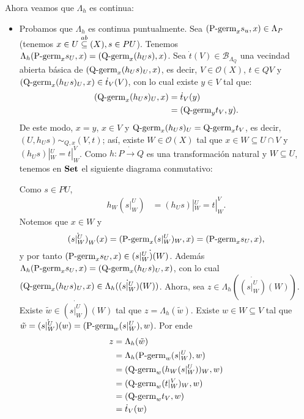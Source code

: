 Ahora veamos que $\Lambda_h$ es continua:
\begin{itemize}
   \item Probamos que $\Lambda_h$ es continua puntualmente. Sea $(\normalfont{\text{P-germ}}_{x}s_{u},x)\in \Lambda_P$ (tenemos $x\in U\stackrel{ab}{\subseteq}(X), s\in PU$). Tenemos $\Lambda_h(\normalfont{\text{P-germ}}_{x}s_{U},x)=(\normalfont{\text{Q-germ}}_{x}(h_{U}s),x)$. Sea $\dot{t}(V)\in\mathcal{B}_{\Lambda_Q}$ una vecindad abierta básica de $(\normalfont{\text{Q-germ}}_{x}(h_{U}s)_{U},x)$, es decir, $V\in\mathcal{O}(X)$, $t\in QV$ y $(\normalfont{\text{Q-germ}}_{x}(h_{U}s)_{U},x)\in\dot{t}_{V}(V)$, con lo cual existe $y\in V$ tal que:
      $$
      \begin{aligned}
         (\normalfont{\text{Q-germ}}_{x}(h_{U}s)_{U},x)&=\dot{t}_{V}(y)\\
                                   &=(\normalfont{\text{Q-germ}}_{y}t_{V},y).
      \end{aligned}
      $$
      De este modo, $x=y$, $x\in V$ y $\normalfont{\text{Q-germ}}_{x}(h_{U}s)_{U}=\normalfont{\text{Q-germ}}_{x}t_{V}$, es decir, $(U,h_{U}s)\sim_{Q,x}(V,t)$; así, existe $W\in\mathcal{O}(X)$ tal que $x\in W\subseteq U\cap V$ y $(h_{U}s)|^{U}_{W}=t|^{V}_{W}$. Como $h:P\dot{\to} Q$ es una transformación natural y $W\subseteq U$, tenemos en $\normalfont{\textbf{Set}}$ el siguiente diagrama conmutativo:
      
      Como $s\in PU$,
      $$
      \begin{aligned}
         h_{W}(s|^{U}_{W})&=(h_{U}s)|^{U}_{W}=t|^{V}_{W}.
      \end{aligned}
      $$
      Notemos que $x\in W$ y 
      $$
         \dot{(s|^{U}_{W})}_{W}(x)=(\normalfont{\text{P-germ}}_{x}(s|^{U}_{W})_W,x)=(\normalfont{\text{P-germ}}_{x}s_{U},x),
      $$
      y por tanto $(\normalfont{\text{P-germ}}_{x}s_{U},x)\in\dot{(s|^{U}_{W})(W)}$. Además $\Lambda_h(\normalfont{\text{P-germ}}_{x}s_{U},x)=(\normalfont{\text{Q-germ}}_{x}(h_{U}s)_{U},x)$, con lo cual $(\normalfont{\text{Q-germ}}_{x}(h_{U}s)_{U},x)\in \Lambda_h(\dot{(s|^{U}_{W}})(W))$. Ahora, sea $z\in \Lambda_h(\dot{(s|^{U}_{W})}(W))$. Existe $\tilde{w}\in\dot{(s|^{U}_{W})}(W)$ tal que $z=\Lambda_h(\tilde{w})$. Existe $w\in W\subseteq V$ tal que $\tilde{w}=\dot{(s|^{U}_{W})}(w)=(\normalfont{\text{P-germ}}_{w}(s|^{U}_{W}),w)$. Por ende
      $$
      \begin{aligned}
         z&=\Lambda_h(\tilde{w})\\
          &=\Lambda_h(\normalfont{\text{P-germ}}_{w}(s|^{U}_{W}),w)\\
          &=(\normalfont{\text{Q-germ}}_{w}(h_{W}(s|^{U}_{W}))_{W},w)\\
          &=(\normalfont{\text{Q-germ}}_{w}(t|^{V}_{W})_{W},w)\\
          &=(\normalfont{\text{Q-germ}}_{w}t_{V},w)\\
          &=\dot{t}_{V}(w)
      \end{aligned}
$$
\end{itemize}
